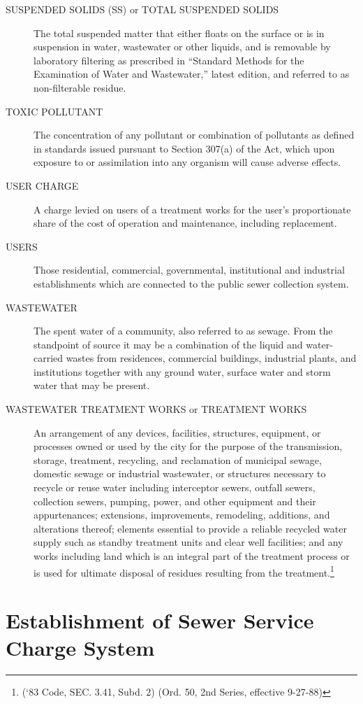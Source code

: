 \begin{description}
\item[SUSPENDED SOLIDS (SS) or TOTAL SUSPENDED SOLIDS] The total suspended matter that either floats on the surface or is in suspension in water, wastewater or other liquids, and is removable by laboratory filtering as prescribed in “Standard Methods for the Examination of Water and Wastewater,” latest edition, and referred to as non-filterable residue.
\item[TOXIC POLLUTANT] The concentration of any pollutant or combination of pollutants as defined in standards issued pursuant to Section 307(a) of the Act, which upon exposure to or assimilation into any organism will cause adverse effects.
\item[USER CHARGE] A charge levied on users of a treatment works for the user’s proportionate share of the cost of operation and maintenance, including replacement.
\item[USERS] Those residential, commercial, governmental, institutional and industrial establishments which are connected to the public sewer collection system.
\item[WASTEWATER] The spent water of a community, also referred to as sewage.  From the standpoint of source it may be a combination of the liquid and water-carried wastes from residences, commercial buildings, industrial plants, and institutions together with any ground water, surface water and storm water that may be present.
\item[WASTEWATER TREATMENT WORKS or TREATMENT WORKS] An arrangement of any devices, facilities, structures, equipment, or processes owned or used by the city for the purpose of the transmission, storage, treatment, recycling, and reclamation of municipal sewage, domestic sewage or industrial wastewater, or structures necessary to recycle or reuse water including interceptor sewers, outfall sewers, collection sewers, pumping, power, and other equipment and their appurtenances; extensions, improvements, remodeling, additions, and alterations thereof; elements essential to provide a reliable recycled water supply such as standby treatment units and clear well facilities; and any works including land which is an integral part of the treatment process or is used for ultimate disposal of residues resulting from the treatment.\footnote{(‘83 Code, SEC. 3.41, Subd. 2) (Ord. 50, 2nd Series, effective 9-27-88)}
\end{description}

\section{Establishment of Sewer Service Charge System}
